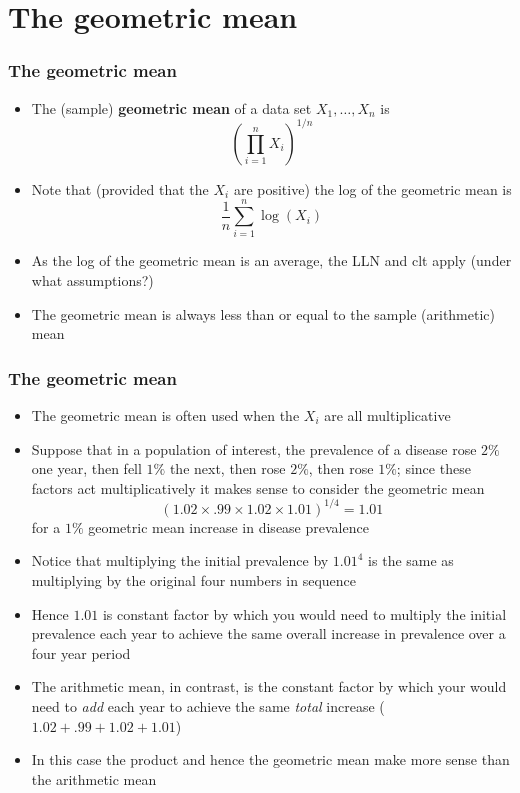 \documentclass[aspectratio=169]{beamer}
\begin{document}
\section{The geometric mean}
\begin{frame}\frametitle{The geometric mean}
\begin{itemize}
\item The (sample) {\bf geometric mean} of a data set $X_1,\ldots,X_n$ is
  $$
  \left(\prod_{i=1}^n X_i \right)^{1/n}
  $$
\item Note that (provided that the $X_i$ are positive) the log of the
  geometric mean is
  $$
  \frac{1}{n}\sum_{i=1}^n \log(X_i)
  $$
\item As the log of the geometric mean is an average, the LLN and clt apply
  (under what assumptions?)
\item The geometric mean is always less than or equal to the sample
  (arithmetic) mean
\end{itemize}
\end{frame}

\begin{frame}\frametitle{The geometric mean}
\begin{itemize}
\item The geometric mean is often used when the $X_i$ are all multiplicative
\item Suppose that in a population of interest, the prevalence of a
  disease rose $2\%$ one year, then fell $1\%$ the next, then rose
  $2\%$, then rose $1\%$; since these factors act multiplicatively it
  makes sense to consider the geometric mean
  $$
  \left(1.02 \times .99 \times 1.02 \times 1.01\right)^{1/4} = 1.01
  $$
  for a $1\%$ geometric mean increase in disease prevalence
\end{itemize}
\end{frame}

\begin{frame}
\begin{itemize}
\item Notice that multiplying the initial prevalence by $1.01^4$ is the
  same as multiplying by the original four numbers in sequence
\item Hence $1.01$ is constant factor by which you would need to multiply
  the initial prevalence each year to achieve the same overall increase
  in prevalence over a four year period
\item The arithmetic mean, in contrast, is the constant factor by which
  your would need to {\em add} each year to achieve the same {\em
    total} increase ($1.02 + .99 + 1.02 + 1.01$)
\item In this case the product and hence the geometric mean make more
  sense than the arithmetic mean
\end{itemize}
\end{frame}
\end{document}
